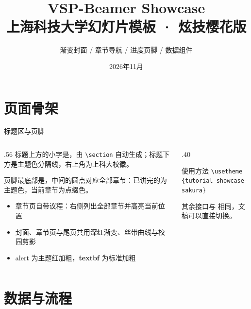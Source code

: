 \documentclass[aspectratio=169,10pt]{beamer}
\title[VSP-Beamer Showcase]{VSP-Beamer Showcase\\上海科技大学幻灯片模板 · 炫技樱花版}
\subtitle{渐变封面 / 章节导航 / 进度页脚 / 数据组件}
\date{2026年11月}
\begin{document}
\VSPtitleframe

\section{页面骨架}

\begin{frame}[t]{标题区与页脚}
\begin{columns}[T,onlytextwidth]
  \begin{column}{.56\textwidth}
    标题上方的小字是，由 \texttt{\textbackslash section} 自动生成；标题下方是主题色分隔线，右上角为上科大校徽。

    页脚最底部是，中间的圆点对应全部章节：已讲完的为主题色，当前章节为点缀色。

    \begin{itemize}
      \item 章节页自带议程：右侧列出全部章节并高亮当前位置
      \item 封面、章节页与尾页共用深红渐变、丝带曲线与校园剪影
      \item \alert{alert} 为主题红加粗，\textbf{textbf} 为标准加粗
    \end{itemize}
  \end{column}
  \begin{column}{.40\textwidth}
    \begin{vspquote}{使用方法}
      \texttt{\textbackslash usetheme}\\\texttt{\{tutorial-showcase-sakura\}}

      其余接口与  相同，文稿可以直接切换。
    \end{vspquote}
      
  \end{column}
\end{columns}
\end{frame}

\section{数据与流程}
\end{document}
